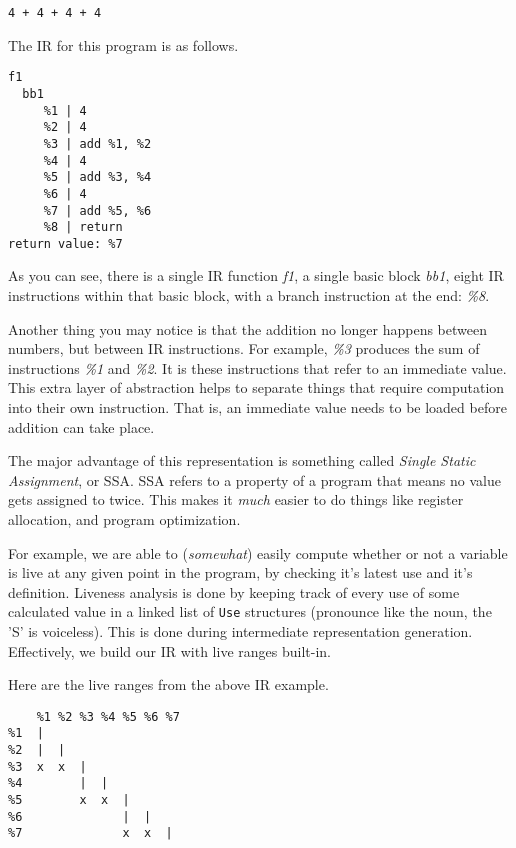 \documentclass[
12pt,
letterpaper,
oneside,
]{memoir}
\begin{document}
\begin{verbatim}
4 + 4 + 4 + 4
\end{verbatim}

\filbreak
\noindent

The IR for this program is as follows.

\begin{verbatim}
f1
  bb1
     %1 | 4
     %2 | 4
     %3 | add %1, %2
     %4 | 4
     %5 | add %3, %4
     %6 | 4
     %7 | add %5, %6
     %8 | return
return value: %7
\end{verbatim}

As you can see, there is a single IR function \emph{f1}, a single basic block \emph{bb1}, eight IR instructions within that basic block, with a branch instruction at the end: \emph{\%8}.

Another thing you may notice is that the addition no longer happens between numbers, but between IR instructions. For example, \emph{\%3} produces the sum of instructions \emph{\%1} and \emph{\%2}. It is these instructions that refer to an immediate value. This extra layer of abstraction helps to separate things that require computation into their own instruction. That is, an immediate value needs to be loaded before addition can take place.

The major advantage of this representation is something called \emph{Single Static Assignment}, or SSA. SSA refers to a property of a program that means no value gets assigned to twice. This makes it \emph{much} easier to do things like register allocation, and program optimization.

\filbreak

For example, we are able to ({\footnotesize \emph{somewhat}}) easily compute whether or not a variable is live at any given point in the program, by checking it's latest use and it's definition. Liveness analysis is done by keeping track of every use of some calculated value in a linked list of \verb|Use| structures (pronounce like the noun, the 'S' is voiceless). This is done during intermediate representation generation. Effectively, we build our IR with live ranges built-in.

Here are the live ranges from the above IR example.

\begin{verbatim}
    %1 %2 %3 %4 %5 %6 %7
%1  |
%2  |  |
%3  x  x  |
%4        |  |
%5        x  x  |
%6              |  |
%7              x  x  |
\end{verbatim}
\end{document}
